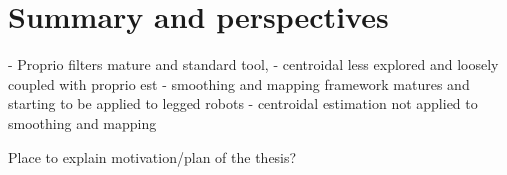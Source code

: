 \section{Summary and perspectives}
- Proprio filters mature and standard tool, 
- centroidal less explored and loosely coupled with proprio est
- smoothing and mapping framework matures and starting to be applied to legged robots
- centroidal estimation not applied to smoothing and mapping

Place to explain motivation/plan of the thesis?





\newcommand{\fakeimage}{{\fboxsep=-\fboxrule\fbox{\rule{0pt}{3cm}\hspace{4cm}}}}


